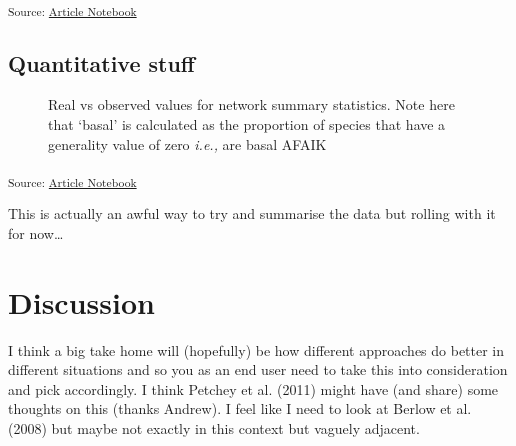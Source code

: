 \documentclass[
]{agujournal2019}
\begin{document}
\textsubscript{Source:
\href{https://BecksLab.github.io/ms_t_is_for_topology/index.qmd.html}{Article
Notebook}}

\subsection{Quantitative stuff}\label{quantitative-stuff}

\begin{figure}[H]


\caption{\label{fig-topology}Real vs observed values for network summary
statistics. Note here that `basal' is calculated as the proportion of
species that have a generality value of zero \emph{i.e.,} are basal
AFAIK}

\end{figure}%

\textsubscript{Source:
\href{https://BecksLab.github.io/ms_t_is_for_topology/index.qmd.html}{Article
Notebook}}

This is actually an awful way to try and summarise the data but rolling
with it for now\ldots{}

\section{Discussion}\label{discussion}

I think a big take home will (hopefully) be how different approaches do
better in different situations and so you as an end user need to take
this into consideration and pick accordingly. I think Petchey et al.
(2011) might have (and share) some thoughts on this (thanks Andrew). I
feel like I need to look at Berlow et al. (2008) but maybe not exactly
in this context but vaguely adjacent.
\end{document}
